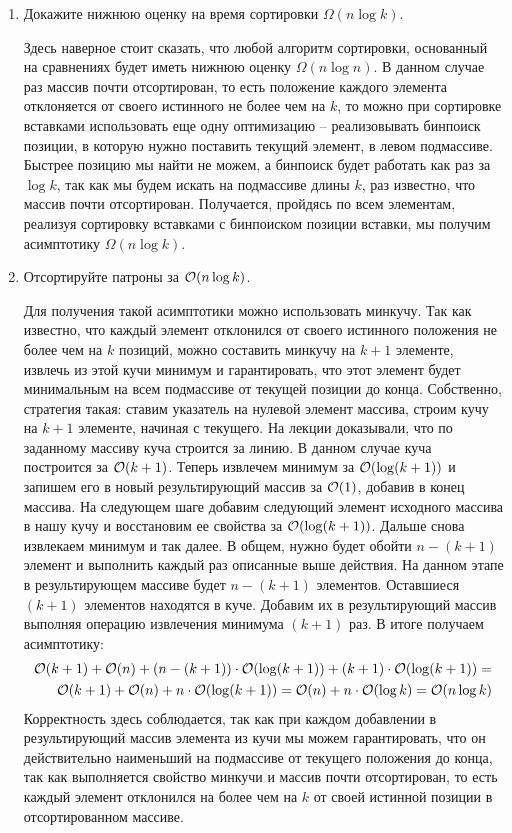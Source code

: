 \begin{enumerate}
\begin{enumerate}
\begin{solution}
     \end{solution}
     \item Докажите нижнюю оценку на время сортировки $\Omega(n \log k)$.
     \begin{solution}
      Здесь наверное стоит сказать, что любой алгоритм сортировки, основанный на сравнениях будет иметь нижнюю оценку $\Omega(n \log n)$. В данном случае раз массив почти отсортирован, то есть положение каждого элемента отклоняется от своего истинного не более чем на $k$, то можно при сортировке вставками использовать еще одну оптимизацию -- реализовывать бинпоиск позиции, в которую нужно поставить текущий элемент, в левом подмассиве. Быстрее позицию мы найти не можем, а бинпоиск будет работать как раз за $\log k$, так как мы будем искать на подмассиве длины $k$, раз известно, что массив почти отсортирован. Получается, пройдясь по всем элементам, реализуя сортировку вставками с бинпоиском позиции вставки, мы получим асимптотику $\Omega(n \log k)$.
     \end{solution}
     \item Отсортируйте патроны за $\mathcal{O}(n \log k)$.
     \begin{solution}
      Для получения такой асимптотики можно использовать минкучу. Так как известно, что каждый элемент отклонился от своего истинного положения не более чем на $k$ позиций, можно составить минкучу на $k+1$ элементе, извлечь из этой кучи минимум и гарантировать, что этот элемент будет минимальным на всем подмассиве от текущей позиции до конца. Собственно, стратегия такая: ставим указатель на нулевой элемент массива, строим кучу на $k+1$ элементе, начиная с текущего. На лекции доказывали, что по заданному массиву куча строится за линию. В данном случае куча построится за $\mathcal{O}(k+1)$. Теперь извлечем минимум за $\mathcal{O}(\log (k+1))$ и запишем его в новый результирующий массив за $\mathcal{O}(1)$, добавив в конец массива. На следующем шаге добавим следующий элемент исходного массива в нашу кучу и восстановим ее свойства за $\mathcal{O}(\log (k+1))$. Дальше снова извлекаем минимум и так далее. В общем, нужно будет обойти $n-(k+1)$ элемент и выполнить каждый раз описанные выше действия. На данном этапе в результирующем массиве будет $n-(k+1)$ элементов. Оставшиеся $(k+1)$ элементов находятся в куче. Добавим их в результирующий массив выполняя операцию извлечения минимума $(k+1)$ раз. В итоге получаем асимптотику:
      \begin{eqnarray}
        \mathcal{O}(k+1) + \mathcal{O}(n) + (n-(k+1)) \cdot \mathcal{O}(\log (k+1)) + (k+1) \cdot \mathcal{O}(\log (k+1)) = \\
        \mathcal{O}(k+1) + \mathcal{O}(n) + n \cdot \mathcal{O}(\log (k+1)) = \mathcal{O}(n) + n \cdot \mathcal{O}(\log k) = \mathcal{O}(n\log k)
      \end{eqnarray}
      Корректность здесь соблюдается, так как при каждом добавлении в результирующий массив элемента из кучи мы можем гарантировать, что он действительно наименьший на подмассиве от текущего положения до конца, так как выполняется свойство минкучи и массив почти отсортирован, то есть каждый элемент отклонился на более чем на $k$ от своей истинной позиции в отсортированном массиве.
     \end{solution}
  \end{enumerate}


\end{enumerate}
